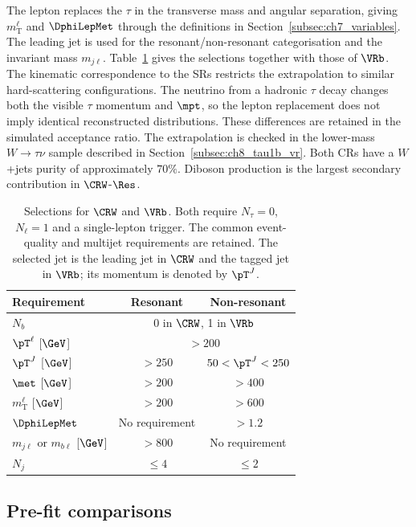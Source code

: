 The lepton replaces the $\tau$ in the transverse mass and angular separation, giving $m_{\mathrm{T}}^\ell$ and $\DphiLepMet$ through the definitions in Section~\ref{subsec:ch7_variables}.
The leading jet is used for the resonant/non-resonant categorisation and the invariant mass $m_{j\ell}$.
Table~\ref{tab:ch8_wcr_vrw} gives the selections together with those of $\VRb$.
The kinematic correspondence to the SRs restricts the extrapolation to similar hard-scattering configurations.
The neutrino from a hadronic $\tau$ decay changes both the visible $\tau$ momentum and $\mpt$, so the lepton replacement does not imply identical reconstructed distributions.
These differences are retained in the simulated acceptance ratio.
The extrapolation is checked in the lower-mass $W\to\tau\nu$ sample described in Section~\ref{subsec:ch8_tau1b_vr}.
Both CRs have a $W$+jets purity of approximately $70\%$.
Diboson production is the largest secondary contribution in $\CRW$-$\Res$.

\begin{table}[htbp]
    \centering
    \small
    \caption{Selections for $\CRW$ and $\VRb$. Both require $N_\tau=0$, $N_\ell=1$ and a single-lepton trigger. The common event-quality and multijet requirements are retained. The selected jet is the leading jet in $\CRW$ and the tagged jet in $\VRb$; its momentum is denoted by $\pT^J$.}
    \label{tab:ch8_wcr_vrw}
    \begin{tabular}{lcc}
        \toprule
        Requirement & Resonant & Non-resonant \\
        \midrule
        $N_b$ & \multicolumn{2}{c}{0 in $\CRW$, 1 in $\VRb$} \\
        $\pT^\ell$ [$\GeV$] & \multicolumn{2}{c}{$>200$} \\
        $\pT^J$ [$\GeV$] & $>250$ & $50<\pT^J<250$ \\
        $\met$ [$\GeV$] & $>200$ & $>400$ \\
        $m_{\mathrm{T}}^\ell$ [$\GeV$] & $>200$ & $>600$ \\
        $\DphiLepMet$ & No requirement & $>1.2$ \\
        $m_{j\ell}$ or $m_{b\ell}$ [$\GeV$] & $>800$ & No requirement \\
        $N_j$ & $\leq4$ & $\leq2$ \\
        \bottomrule
    \end{tabular}
\end{table}

\subsection{Pre-fit comparisons}
\label{subsec:ch8_wcr_prefit}

